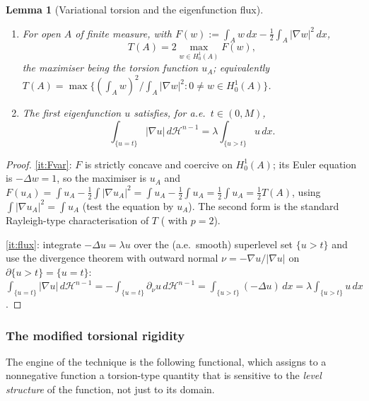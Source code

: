 \documentclass[11pt]{amsart}
\newtheorem{lemma}[theorem]{Lemma}
\theoremstyle{definition}
\newcommand{\HH}{\mathcal H}
\newcommand{\abs}[1]{\left|#1\right|}
\newcommand{\dx}{\,dx}
\newcommand{\dH}{\,d\HH^{n-1}}
\begin{document}
\begin{lemma}[Variational torsion and the eigenfunction flux]\label{lem:prelim}
\leavevmode
\begin{enumerate}[label=\textup{(\roman*)}]
\item\label{it:Fvar} For open $A$ of finite measure, with
$F(w):=\int_A w\dx-\tfrac12\int_A\abs{\nabla w}^2\dx$,
\begin{equation}\label{eq:Tvar}
  T(A)=2\max_{w\in H^1_0(A)}F(w),
\end{equation}
the maximiser being the torsion function $u_A$; equivalently
$T(A)=\max\{(\int_A w)^2/\int_A\abs{\nabla w}^2:0\ne w\in H^1_0(A)\}$.
\item\label{it:flux} The first eigenfunction $u$ satisfies, for a.e.\
$t\in(0,M)$,
\begin{equation}\label{eq:flux}
  \int_{\{u=t\}}\abs{\nabla u}\dH=\lambda\int_{\{u>t\}}u\dx .
\end{equation}
\end{enumerate}
\end{lemma}

\begin{proof}
\ref{it:Fvar}: $F$ is strictly concave and coercive on $H^1_0(A)$; its Euler
equation is $-\Delta w=1$, so the maximiser is $u_A$ and
$F(u_A)=\int u_A-\tfrac12\int\abs{\nabla u_A}^2=\int u_A-\tfrac12\int u_A
=\tfrac12\int u_A=\tfrac12 T(A)$, using $\int\abs{\nabla u_A}^2=\int u_A$
(test the equation by $u_A$). The second form is the standard Rayleigh-type
characterisation of $T$ (\cite[Prop.~2.2]{Brasco2014} with $p=2$).

\ref{it:flux}: integrate $-\Delta u=\lambda u$ over the
(a.e.\ smooth) superlevel set $\{u>t\}$ and use the divergence theorem with
outward normal $\nu=-\nabla u/\abs{\nabla u}$ on $\partial\{u>t\}=\{u=t\}$:
$\int_{\{u=t\}}\abs{\nabla u}\dH=-\int_{\{u=t\}}\partial_\nu u\dH
=\int_{\{u>t\}}(-\Delta u)\dx=\lambda\int_{\{u>t\}}u\dx$.
\end{proof}

\subsubsection*{The modified torsional rigidity}

The engine of the technique is the following functional, which assigns to a
nonnegative function a torsion-type quantity that is sensitive to the
\emph{level structure} of the function, not just to its domain.
\end{document}
